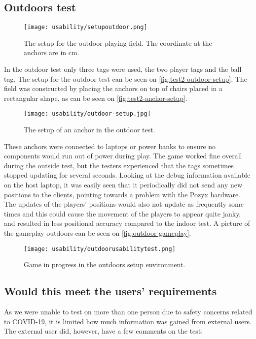 \subsection{Outdoors test}
\begin{figure}[H]
    \centering
    \texttt{[image: usability/setupoutdoor.png]}
    \caption{The setup for the outdoor playing field. The coordinate at the anchors are in cm.}
    \label{fig:test2-outdoor-setup}
\end{figure}
\noindent
In the outdoor test only three tags were used, the two player tags and the ball tag.
The setup for the outdoor test can be seen on \autoref{fig:test2-outdoor-setup}.
The field was constructed by placing the anchors on top of chairs placed in a rectangular shape, as can be seen on \autoref{fig:test2-anchor-setup}.
\begin{figure}[H]
    \centering
    \texttt{[image: usability/outdoor-setup.jpg]}
    \caption{The setup of an anchor in the outdoor test.}
    \label{fig:test2-anchor-setup}
\end{figure}
\noindent
These anchors were connected to laptops or power banks to ensure no components would run out of power during play.
The game worked fine overall during the outside test, but the testers experienced that the tags sometimes stopped updating for several seconds.
Looking at the debug information available on the host laptop, it was easily seen that it periodically did not send any new positions to the clients, pointing towards a problem with the Pozyx hardware.
The updates of the players' positions would also not update as frequently some times and this could cause the movement of the players to appear quite janky, and resulted in less positional accuracy compared to the indoor test.
A picture of the gameplay outdoors can be seen on \autoref{fig:outdoor-gameplay}.
\begin{figure}[H]
    \centering
    \texttt{[image: usability/outdoorusabilitytest.png]}
    \caption{Game in progress in the outdoors setup environment.}
    \label{fig:outdoor-gameplay}
\end{figure}

\subsection{Would this meet the users' requirements}
As we were unable to test on more than one person due to safety concerns related to COVID-19, it is limited how much information was gained from external users.
The external user did, however, have a few comments on the test:

